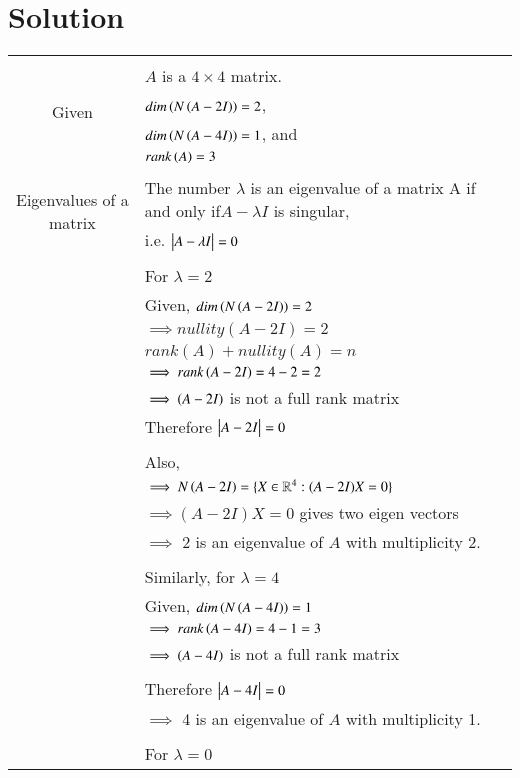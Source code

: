 \documentclass[journal,12pt]{IEEEtran}
\begin{document}
\section{\textbf{Solution}}
\begin{longtable}{|c|l|}
    \hline
	\multirow{5}{*}{Given} 
	& \\
	& $A$ is a $4\times 4$ matrix.\\
	& $dim\left(N\left(A-2I\right)\right)=2$,\\
	& $dim\left(N\left(A-4I\right)\right)=1$, and\\
	& $rank\left(A\right)=3$\\
	\hline
	\multirow{3}{*}{Eigenvalues of a matrix} 
	&\\
	& The number $\lambda$ is an eigenvalue of a matrix A if and only if$A-\lambda I$ is singular,\\
	& i.e. $\begin{vmatrix}A-\lambda I\end{vmatrix}=0$ \\
	&\\
	& For $\lambda=2$\\
	& Given, $dim\left(N\left(A-2I\right)\right)=2$\\
	& $\implies nullity(A-2I)=2$\\
	& $rank(A)+nullity(A)=n$\\
	& $\implies rank\left(A-2I\right)=4-2=2$\\
	& $\implies \left(A-2I\right)$ is not a full rank matrix\\
	& Therefore $\begin{vmatrix}A-2I\end{vmatrix}=0$\\
	&\\
	& Also,\\
	& $\implies N\left(A-2I\right)=\{X\in \mathbb{R}^4:(A-2I)X=0\}$ \\
	& $\implies (A-2I)X=0$ gives two eigen vectors\\
	& $\implies$ 2 is an eigenvalue of $A$ with multiplicity 2.\\
	&\\
	& Similarly, for $\lambda=4$\\
	& Given, $dim\left(N\left(A-4I\right)\right)=1$\\
	& $\implies rank\left(A-4I\right)=4-1=3$\\
	& $\implies \left(A-4I\right)$ is not a full rank matrix\\
	\hline \newpage \hline 
	&\\
	& Therefore $\begin{vmatrix}A-4I\end{vmatrix}=0$\\
	& $\implies$ 4 is an eigenvalue of $A$ with multiplicity 1.\\
	&\\
	& For $\lambda=0$\\

\end{longtable}
\end{document}
